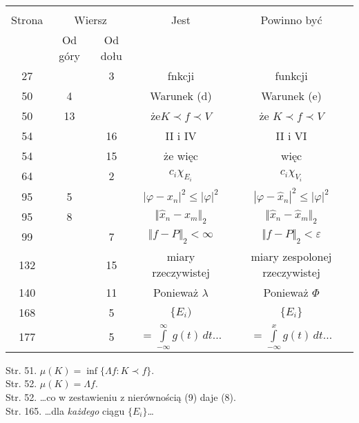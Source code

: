 \documentclass[a4paper,11pt]{article}
\begin{document}
\begin{center}

  \begin{tabular}{|c|c|c|c|c|}
    \hline
    & \multicolumn{2}{c|}{} & & \\
    Strona & \multicolumn{2}{c|}{Wiersz} & Jest
                              & Powinno być \\ \cline{2-3}
    & Od góry & Od dołu & & \\
    \hline
    27  & &  3 & fnkcji & funkcji \\
    50  &  4 &  & Warunek (d) & Warunek (e) \\
    50  & 13 &  & że$K \prec f  \prec V$ & że $K \prec f  \prec V$ \\
    54  & & 16 & II i IV & II i VI \\
    54  & & 15 & że więc & więc \\
    64  & &  2 & $c_{ i } \chi_{ E_{ i } }$ & $c_{ i } \chi_{ V_{ i } }$ \\
    95  &  5 & & $| \varphi - x_{ n } |^{ 2 } \leq | \varphi |^{ 2 }$
           & $| \varphi - \hat{ x }_{ n } |^{ 2 } \leq | \varphi |^{ 2 }$ \\
    95  &  8 & & $\Vert \hat{ x }_{ n } - x_{ m } \Vert_{ 2 }$
           & $\Vert \hat{ x }_{ n } - \hat{ x }_{ m } \Vert_{ 2 }$ \\
    99  & &  7 & $\Vert f - P \Vert_{ 2 } < \infty$
           & $\Vert f - P \Vert_{ 2 } < \varepsilon$ \\
    132 &  & 15 & miary rzeczywistej & miary zespolonej rzeczywistej \\
    140 & & 11 & Ponieważ $\lambda$ & Ponieważ $\Phi$ \\
    168 & &  5 & $\{ E_{ i } )$ & $\{ E_{ i } \}$ \\
    177 & &  5 & $= \int\limits^{ \infty }_{ -\infty } g( t ) \, dt \ldots$
           & $= \int\limits^{ x }_{ -\infty } g( t ) \, dt \ldots$ \\
    \hline
  \end{tabular}

\end{center}


Str. 51. $\mu( K ) = \inf\{ \Lambda f : K \prec f \}$. \\
Str. 52. $\mu( K ) = \Lambda f$. \\
Str. 52. \ldots co w zestawieniu z nierównością (9) daje (8). \\
Str. 165. \ldots dla \textit{każdego} ciągu $\{ E_{ i } \}$\ldots
\end{document}
